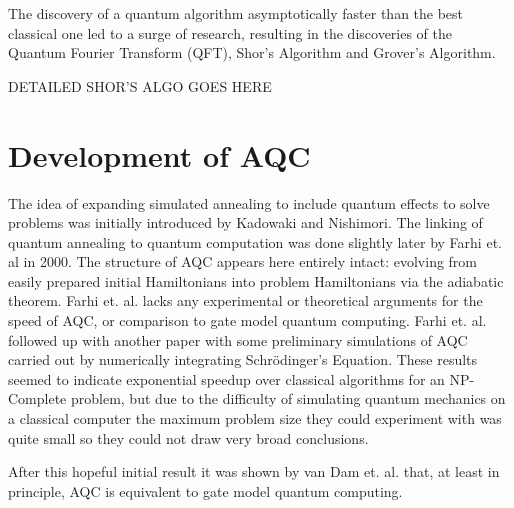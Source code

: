 The discovery of a quantum algorithm asymptotically faster than the best classical one led to a surge of research, resulting in the discoveries of the Quantum Fourier Transform (QFT)\cite{qcbook}, Shor's\cite{shor} Algorithm and Grover's Algorithm\cite{grover}.

DETAILED SHOR'S ALGO GOES HERE

\section{Development of AQC}
The idea of expanding simulated annealing to include quantum effects to solve problems was initially introduced by Kadowaki and Nishimori.\cite{transverse}  The linking of quantum annealing to quantum computation was done slightly later by Farhi et. al in 2000.\cite{farhi}  The structure of AQC appears here entirely intact: evolving from easily prepared initial Hamiltonians into problem Hamiltonians via the adiabatic theorem.  Farhi et. al.\cite{farhi} lacks any experimental or theoretical arguments for the speed of AQC, or comparison to gate model quantum computing.  Farhi et. al. followed up with another paper\cite{farhi2} with some preliminary simulations of AQC carried out by numerically integrating Schr\"odinger's Equation.  These results seemed to indicate exponential speedup over classical algorithms for an NP-Complete problem, but due to the difficulty of simulating quantum mechanics on a classical computer the maximum problem size they could experiment with was quite small so they could not draw very broad conclusions.

After this hopeful initial result it was shown by van Dam et. al.\cite{vandam} that, at least in principle, AQC is equivalent to gate model quantum computing. 
